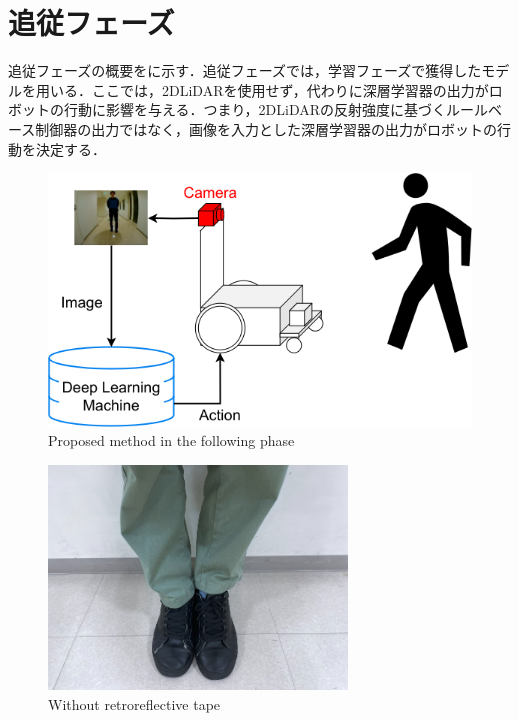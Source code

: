 
\section{追従フェーズ}

  追従フェーズの概要をに示す．追従フェーズでは，学習フェーズで獲得したモデルを用いる．ここでは，2DLiDARを使用せず，代わりに深層学習器の出力がロボットの行動に影響を与える．つまり，2DLiDARの反射強度に基づくルールベース制御器の出力ではなく，画像を入力とした深層学習器の出力がロボットの行動を決定する．

  \vspace{0.5cm}

  \begin{figure}[h]
    \centering
    \includegraphics[keepaspectratio, scale=0.45] {images/RobotGuidance_following_system.png}
    \captionsetup{justification=raggedright} %
    \caption{Proposed method in the following phase}
    \label{Fig:RobotGuidance_following_system}
  \end{figure}

  \vspace{0.5cm}

  \begin{figure}[h]
    \centering
    \includegraphics[keepaspectratio, scale=0.55] {images/RobotGuidance_following_phase_leg.png}
    \captionsetup{justification=raggedright} %
    \caption{Without retroreflective tape}
    \label{Fig:RobotGuidance_following_phase_leg}
  \end{figure}

\newpage
